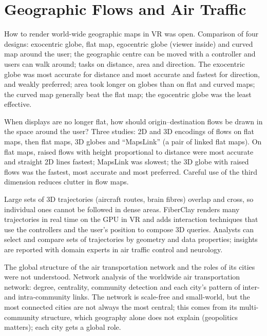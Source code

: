 \documentclass[11pt,a4paper]{article}
\begin{document}
\section{Geographic Flows and Air Traffic}
\label{sec:geo}

\prob How to render world-wide geographic maps in VR was open.
\meth Comparison of four designs: exocentric globe, flat map, egocentric globe (viewer
inside) and curved map around the user; the geographic centre can be moved with a
controller and users can walk around; tasks on distance, area and direction.
\res The exocentric globe was most accurate for distance and most accurate and fastest for
direction, and weakly preferred; area took longer on globes than on flat and curved maps;
the curved map generally beat the flat map; the egocentric globe was the least effective.

\prob When displays are no longer flat, how should origin--destination flows be drawn in
the space around the user?
\meth Three studies: 2D and 3D encodings of flows on flat maps, then flat maps, 3D globes
and ``MapsLink'' (a pair of linked flat maps).
\res On flat maps, raised flows with height proportional to distance were most accurate and
straight 2D lines fastest; MapsLink was slowest; the 3D globe with raised flows was the
fastest, most accurate and most preferred. Careful use of the third dimension reduces
clutter in flow maps.

\prob Large sets of 3D trajectories (aircraft routes, brain fibres) overlap and cross,
so individual ones cannot be followed in dense areas.
\meth FiberClay renders many trajectories in real time on the GPU in VR and adds
interaction techniques that use the controllers and the user's position to compose 3D
queries.
\res Analysts can select and compare sets of trajectories by geometry and data
properties; insights are reported with domain experts in air traffic control and
neurology.

\prob The global structure of the air transportation network and the roles of its cities
were not understood.
\meth Network analysis of the worldwide air transportation network: degree, centrality,
community detection and each city's pattern of inter- and intra-community links.
\res The network is scale-free and small-world, but the most connected cities are not
always the most central; this comes from its multi-community structure, which geography
alone does not explain (geopolitics matters); each city gets a global role.
\end{document}
